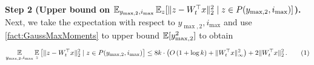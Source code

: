\documentclass[11pt,letterpaper]{article}
\theoremstyle{plain}
\theoremstyle{definition}
\theoremstyle{remark}
\newcommand{\yesnum}{\addtocounter{equation}{1}\tag{\theequation}}
\newcommand{\inparen}[1]{\ensuremath{\left(#1\right)}}
\newcommand{\insquare}[1]{\ensuremath{\left[#1\right]}}
\newcommand{\snorm}[1]{\ensuremath{\ensuremath{\| #1 \|}}}
\newcommand{\E}{\operatornamewithlimits{\mathbb{E}}}
\newcommand{\Ex}{\E}
\renewcommand{\paragraph}[1]{\medskip \noindent\textbf{#1}~}
\newcommand{\smax}{\max,2} %
\newcommand{\imax}{i_{\max}}
\newcommand{\ysmax}{y_{\smax}}
\begin{document}
{{        \paragraph{Step 2 (Upper bound on $\Ex_{\ysmax,\imax}\Ex_{z}[\snorm{z - W_t^\top x}_2^2 \mid z\in P(\ysmax,\imax)]$).}
            Next, we take the expectation with respect to $\ysmax,\imax$ and use \cref{fact:GaussMaxMoments} to upper bound $\Ex[\ysmax^2]$ to obtain
            \[
                \Ex_{\ysmax,\imax}
                \Ex_z\insquare{
                    \snorm{z - W_t^\top x}_2^2  \mid z\in P(\ysmax,\imax)
                }
                \leq 
                8k\cdot \inparen{
                    O\inparen{1+\log{k}}
                    + \snorm{W_t^\top x}_\infty^2
                 }
                + 2 \snorm{W_t^\top x}_2^2  \,.
                \yesnum\label{eq:2ndPrice:SecondMoment:1}
            \]


}}
\end{document}
